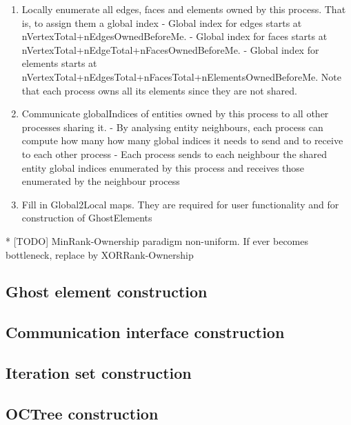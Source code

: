 \begin{enumerate}
    \item Locally enumerate all edges, faces and elements owned by this process. That is, to assign them a global index
       \subitem - Global index for edges starts at nVertexTotal+nEdgesOwnedBeforeMe.
       \subitem - Global index for faces starts at nVertexTotal+nEdgeTotal+nFacesOwnedBeforeMe.
       \subitem - Global index for elements starts at nVertexTotal+nEdgesTotal+nFacesTotal+nElementsOwnedBeforeMe. Note that each process owns all its elements since they are not shared.
    \item Communicate globalIndices of entities owned by this process to all other processes sharing it.
       \subitem - By analysing entity neighbours, each process can compute how many how many global indices it needs to send and to receive to each other process
       \subitem - Each process sends to each neighbour the shared entity global indices enumerated by this process and receives those enumerated by the neighbour process
    \item Fill in Global2Local maps. They are required for user functionality and for construction of GhostElements

	
\end{enumerate}

     * [TODO] MinRank-Ownership paradigm non-uniform. If ever becomes bottleneck, replace by XORRank-Ownership








\subsection{Ghost element construction}
\label{impl-grid-constructor-ghost}


\subsection{Communication interface construction}
\label{impl-grid-constructor-comm}


\subsection{Iteration set construction}
\label{impl-grid-constructor-iterator}


\subsection{OCTree construction}
\label{impl-grid-constructor-octree}





























